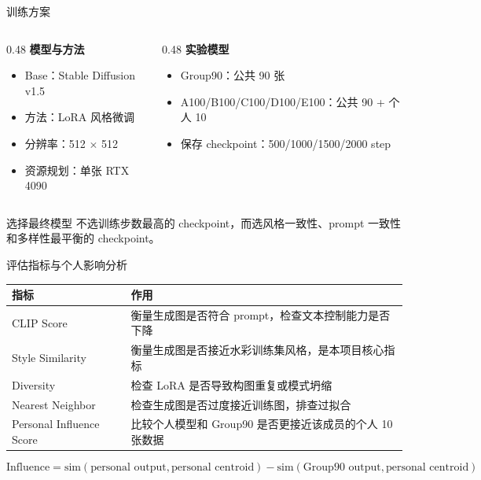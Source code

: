 \documentclass[aspectratio=169,11pt]{ctexbeamer}
\begin{document}
\begin{frame}{训练方案}
  \begin{columns}[T,onlytextwidth]
    \begin{column}{0.48\textwidth}
      \textbf{模型与方法}
      \begin{itemize}
        \item Base：Stable Diffusion v1.5
        \item 方法：LoRA 风格微调
        \item 分辨率：512 $\times$ 512
        \item 资源规划：单张 RTX 4090
      \end{itemize}
    \end{column}
    \begin{column}{0.48\textwidth}
      \textbf{实验模型}
      \begin{itemize}
        \item Group90：公共 90 张
        \item A100/B100/C100/D100/E100：公共 90 + 个人 10
        \item 保存 checkpoint：500/1000/1500/2000 step
      \end{itemize}
    \end{column}
  \end{columns}

  \vspace{0.8em}
  \begin{block}{选择最终模型}
    不选训练步数最高的 checkpoint，而选风格一致性、prompt 一致性和多样性最平衡的 checkpoint。
  \end{block}
\end{frame}

\begin{frame}{评估指标与个人影响分析}
  \small
  \begin{tabularx}{\textwidth}{l X}
    \toprule
    指标 & 作用 \\
    \midrule
    CLIP Score & 衡量生成图是否符合 prompt，检查文本控制能力是否下降 \\
    Style Similarity & 衡量生成图是否接近水彩训练集风格，是本项目核心指标 \\
    Diversity & 检查 LoRA 是否导致构图重复或模式坍缩 \\
    Nearest Neighbor & 检查生成图是否过度接近训练图，排查过拟合 \\
    Personal Influence Score & 比较个人模型和 Group90 是否更接近该成员的个人 10 张数据 \\
    \bottomrule
  \end{tabularx}

  \vspace{0.8em}
  \[
  \text{Influence} =
  \text{sim}(\text{personal output}, \text{personal centroid})
  - \text{sim}(\text{Group90 output}, \text{personal centroid})
  \]
\end{frame}
\end{document}
